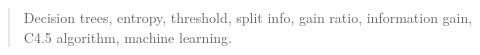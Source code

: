\documentclass[a4paper,12pt,twoside]{memoir}
\begin{document}
\renewcommand*\abstractname{Keywords}
\begin{abstract}

Decision trees, entropy, threshold, split info, gain ratio, information gain, C4.5 algorithm, machine learning.

\end{abstract}

\clearpage

\tableofcontents

\clearpage

\listoffigures

\clearpage

\listoftables
\clearpage

\mainmatter











\end{document}
